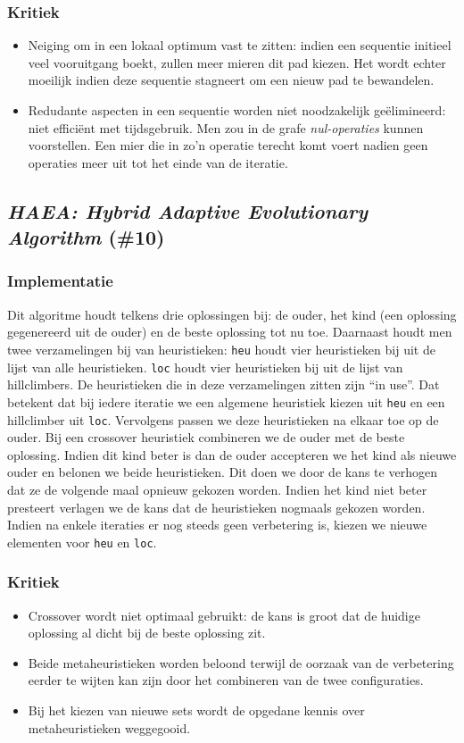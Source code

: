 \subsubsection{Kritiek}
\begin{itemize}
 \item Neiging om in een lokaal optimum vast te zitten: indien een sequentie initieel veel vooruitgang boekt, zullen meer mieren dit pad kiezen. Het wordt echter moeilijk indien deze sequentie stagneert om een nieuw pad te bewandelen.
 \item Redudante aspecten in een sequentie worden niet noodzakelijk ge\"elimineerd: niet effici\"ent met tijdsgebruik. Men zou in de grafe \emph{nul-operaties} kunnen voorstellen. Een mier die in zo'n operatie terecht komt voert nadien geen operaties meer uit tot het einde van de iteratie.
\end{itemize}
\subsection{\emph{HAEA: Hybrid Adaptive Evolutionary Algorithm} (\#10)}
\label{sss:haea}
\subsubsection{Implementatie}
Dit algoritme\cite{chesc-haea,Gomez04selfadaptation} houdt telkens drie oplossingen bij: de ouder, het kind (een oplossing gegenereerd uit de ouder) en de beste oplossing tot nu toe. Daarnaast houdt men twee verzamelingen bij van heuristieken: \texttt{heu} houdt vier heuristieken bij uit de lijst van alle heuristieken. \texttt{loc} houdt vier heuristieken bij uit de lijst van hillclimbers. De heuristieken die in deze verzamelingen zitten zijn ``in use''. Dat betekent dat bij iedere iteratie we een algemene heuristiek kiezen uit \texttt{heu} en een hillclimber uit \texttt{loc}. Vervolgens passen we deze heuristieken na elkaar toe op  de ouder. Bij een crossover heuristiek combineren we de ouder met de beste oplossing. Indien dit kind beter is dan de ouder accepteren we het kind als nieuwe ouder en belonen we beide heuristieken. Dit doen we door de kans te verhogen dat ze de volgende maal opnieuw gekozen worden. Indien het kind niet beter presteert verlagen we de kans dat de 
heuristieken nogmaals gekozen worden. Indien na enkele iteraties er nog steeds geen verbetering is, kiezen we nieuwe elementen voor \texttt{heu} en \texttt{loc}.
\subsubsection{Kritiek}
\begin{itemize}
 \item Crossover wordt niet optimaal gebruikt: de kans is groot dat de huidige oplossing al dicht bij de beste oplossing zit.
 \item Beide metaheuristieken worden beloond terwijl de oorzaak van de verbetering eerder te wijten kan zijn door het combineren van de twee configuraties.
 \item Bij het kiezen van nieuwe sets wordt de opgedane kennis over metaheuristieken weggegooid.
\end{itemize}
